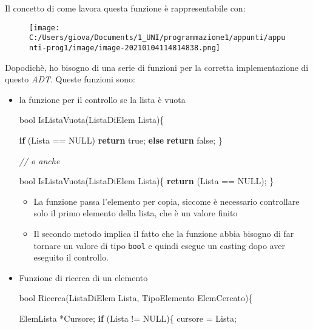 \documentclass[
]{article}
\newenvironment{Shaded}{}{}
\newcommand{\CommentTok}[1]{\textcolor[rgb]{0.38,0.63,0.69}{\textit{#1}}}
\newcommand{\ControlFlowTok}[1]{\textcolor[rgb]{0.00,0.44,0.13}{\textbf{#1}}}
\newcommand{\DataTypeTok}[1]{\textcolor[rgb]{0.56,0.13,0.00}{#1}}
\newcommand{\NormalTok}[1]{#1}
\begin{document}
Il concetto di come lavora questa funzione è rappresentabile con:

\begin{figure}
\centering
\texttt{[image: C:/Users/giova/Documents/1\_UNI/programmazione1/appunti/appunti-prog1/image/image-20210104114814838.png]}
\caption{}
\end{figure}

Dopodichè, ho bisogno di una serie di funzioni per la corretta
implementazione di questo \emph{ADT}. Queste funzioni sono:

\begin{itemize}
\item
  la funzione per il controllo se la lista è vuota

\begin{Shaded}
\begin{Highlighting}[]
\DataTypeTok{bool}\NormalTok{ IsListaVuota(ListaDiElem Lista)\{}
    
    \ControlFlowTok{if}\NormalTok{ (Lista == NULL) }\ControlFlowTok{return}\NormalTok{ true;}
    \ControlFlowTok{else} \ControlFlowTok{return}\NormalTok{ false;}
\NormalTok{\}}

\CommentTok{// o anche}

\DataTypeTok{bool}\NormalTok{ IsListaVuota(ListaDiElem Lista)\{}
    \ControlFlowTok{return}\NormalTok{ (Lista == NULL);}
\NormalTok{\}}
\end{Highlighting}
\end{Shaded}

  \begin{itemize}
  \item
    La funzione passa l'elemento per copia, siccome è necessario
    controllare solo il primo elemento della lista, che è un valore
    finito
  \item
    Il secondo metodo implica il fatto che la funzione abbia bisogno di
    far tornare un valore di tipo \texttt{bool} e quindi esegue un
    casting dopo aver eseguito il controllo.
  \end{itemize}
\item
  Funzione di ricerca di un elemento

\begin{Shaded}
\begin{Highlighting}[]
\DataTypeTok{bool}\NormalTok{ Ricerca(ListaDiElem Lista, TipoElemento ElemCercato)\{}

\NormalTok{    ElemLista *Cursore;}
    \ControlFlowTok{if}\NormalTok{ (Lista != NULL)\{}
\NormalTok{    	cursore = Lista;}
   		

\end{Highlighting}
\end{Shaded}
\end{itemize}
\end{document}
